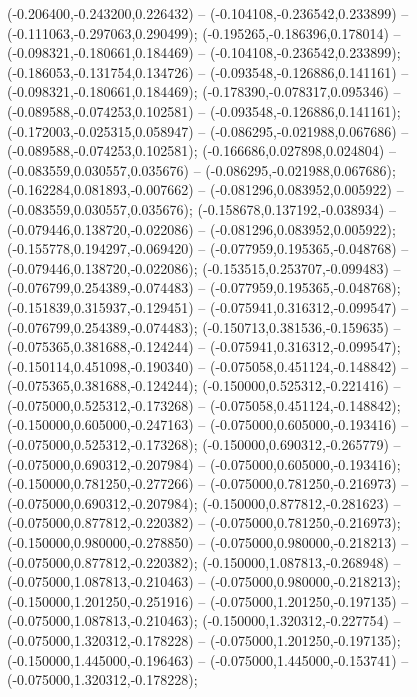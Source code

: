  (-0.206400,-0.243200,0.226432) -- (-0.104108,-0.236542,0.233899) -- (-0.111063,-0.297063,0.290499);
 (-0.195265,-0.186396,0.178014) -- (-0.098321,-0.180661,0.184469) -- (-0.104108,-0.236542,0.233899);
 (-0.186053,-0.131754,0.134726) -- (-0.093548,-0.126886,0.141161) -- (-0.098321,-0.180661,0.184469);
 (-0.178390,-0.078317,0.095346) -- (-0.089588,-0.074253,0.102581) -- (-0.093548,-0.126886,0.141161);
 (-0.172003,-0.025315,0.058947) -- (-0.086295,-0.021988,0.067686) -- (-0.089588,-0.074253,0.102581);
 (-0.166686,0.027898,0.024804) -- (-0.083559,0.030557,0.035676) -- (-0.086295,-0.021988,0.067686);
 (-0.162284,0.081893,-0.007662) -- (-0.081296,0.083952,0.005922) -- (-0.083559,0.030557,0.035676);
 (-0.158678,0.137192,-0.038934) -- (-0.079446,0.138720,-0.022086) -- (-0.081296,0.083952,0.005922);
 (-0.155778,0.194297,-0.069420) -- (-0.077959,0.195365,-0.048768) -- (-0.079446,0.138720,-0.022086);
 (-0.153515,0.253707,-0.099483) -- (-0.076799,0.254389,-0.074483) -- (-0.077959,0.195365,-0.048768);
 (-0.151839,0.315937,-0.129451) -- (-0.075941,0.316312,-0.099547) -- (-0.076799,0.254389,-0.074483);
 (-0.150713,0.381536,-0.159635) -- (-0.075365,0.381688,-0.124244) -- (-0.075941,0.316312,-0.099547);
 (-0.150114,0.451098,-0.190340) -- (-0.075058,0.451124,-0.148842) -- (-0.075365,0.381688,-0.124244);
 (-0.150000,0.525312,-0.221416) -- (-0.075000,0.525312,-0.173268) -- (-0.075058,0.451124,-0.148842);
 (-0.150000,0.605000,-0.247163) -- (-0.075000,0.605000,-0.193416) -- (-0.075000,0.525312,-0.173268);
 (-0.150000,0.690312,-0.265779) -- (-0.075000,0.690312,-0.207984) -- (-0.075000,0.605000,-0.193416);
 (-0.150000,0.781250,-0.277266) -- (-0.075000,0.781250,-0.216973) -- (-0.075000,0.690312,-0.207984);
 (-0.150000,0.877812,-0.281623) -- (-0.075000,0.877812,-0.220382) -- (-0.075000,0.781250,-0.216973);
 (-0.150000,0.980000,-0.278850) -- (-0.075000,0.980000,-0.218213) -- (-0.075000,0.877812,-0.220382);
 (-0.150000,1.087813,-0.268948) -- (-0.075000,1.087813,-0.210463) -- (-0.075000,0.980000,-0.218213);
 (-0.150000,1.201250,-0.251916) -- (-0.075000,1.201250,-0.197135) -- (-0.075000,1.087813,-0.210463);
 (-0.150000,1.320312,-0.227754) -- (-0.075000,1.320312,-0.178228) -- (-0.075000,1.201250,-0.197135);
 (-0.150000,1.445000,-0.196463) -- (-0.075000,1.445000,-0.153741) -- (-0.075000,1.320312,-0.178228);
